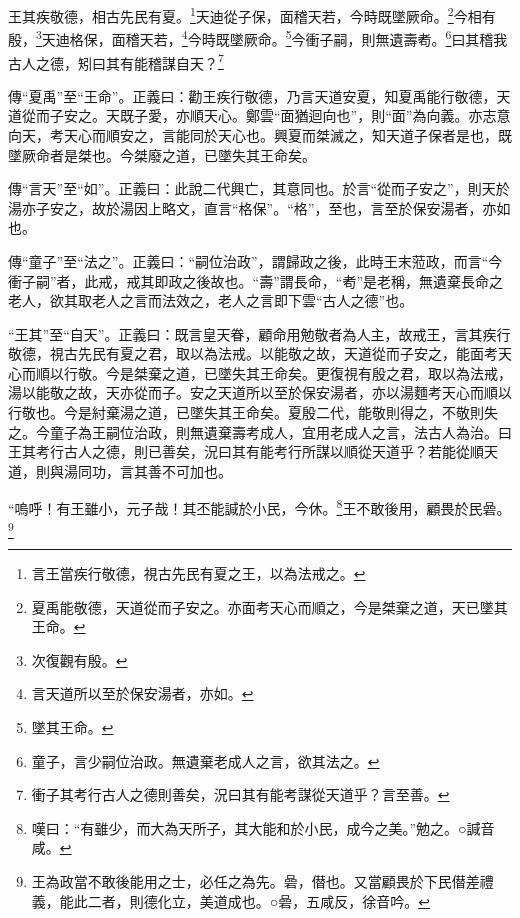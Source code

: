 王其疾敬德，相古先民有夏。\footnote{言王當疾行敬德，視古先民有夏之王，以為法戒之。}天迪從子保，面稽天若，今時既墜厥命。\footnote{夏禹能敬德，天道從而子安之。亦面考天心而順之，今是桀棄之道，天已墜其王命。}今相有殷，\footnote{次復觀有殷。}天迪格保，面稽天若，\footnote{言天道所以至於保安湯者，亦如。}今時既墜厥命。\footnote{墜其王命。}今衝子嗣，則無遺壽耇。\footnote{童子，言少嗣位治政。無遺棄老成人之言，欲其法之。}曰其稽我古人之德，矧曰其有能稽謀自天？\footnote{衝子其考行古人之德則善矣，況曰其有能考謀從天道乎？言至善。}


{\noindent\zhuan{}\fzbyks 傳“夏禹”至“王命”。正義曰：勸王疾行敬德，乃言天道安夏，知夏禹能行敬德，天道從而子安之。天既子愛，亦順天心。鄭雲“面猶迴向也”，則“面”為向義。亦志意向天，考天心而順安之，言能同於天心也。興夏而桀滅之，知天道子保者是也，既墜厥命者是桀也。今桀廢之道，已墜失其王命矣。 \par}

{\noindent\zhuan{}\fzbyks 傳“言天”至“如”。正義曰：此說二代興亡，其意同也。於言“從而子安之”，則天於湯亦子安之，故於湯因上略文，直言“格保”。“格”，至也，言至於保安湯者，亦如也。 \par}

{\noindent\zhuan{}\fzbyks 傳“童子”至“法之”。正義曰：“嗣位治政”，謂歸政之後，此時王末蒞政，而言“今衝子嗣”者，此戒，戒其即政之後故也。“壽”謂長命，“耇”是老稱，無遺棄長命之老人，欲其取老人之言而法效之，老人之言即下雲“古人之德”也。 \par}

{\noindent\shu{}\fzkt “王其”至“自天”。正義曰：既言皇天眷，顧命用勉敬者為人主，故戒王，言其疾行敬德，視古先民有夏之君，取以為法戒。以能敬之故，天道從而子安之，能面考天心而順以行敬。今是桀棄之道，已墜失其王命矣。更復視有殷之君，取以為法戒，湯以能敬之故，天亦從而子。安之天道所以至於保安湯者，亦以湯麵考天心而順以行敬也。今是紂棄湯之道，已墜失其王命矣。夏殷二代，能敬則得之，不敬則失之。今童子為王嗣位治政，則無遺棄壽考成人，宜用老成人之言，法古人為治。曰王其考行古人之德，則已善矣，況曰其有能考行所謀以順從天道乎？若能從順天道，則與湯同功，言其善不可加也。 \par}

“嗚呼！有王雖小，元子哉！其丕能諴於小民，今休。\footnote{嘆曰：“有雖少，而大為天所子，其大能和於小民，成今之美。”勉之。○諴音咸。}王不敢後用，顧畏於民碞。\footnote{王為政當不敢後能用之士，必任之為先。碞，僣也。又當顧畏於下民僣差禮義，能此二者，則德化立，美道成也。○碞，五咸反，徐音吟。}


